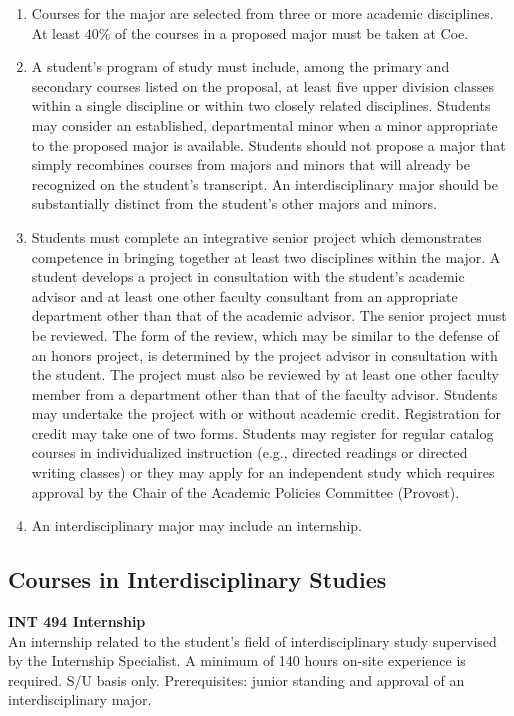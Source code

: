 \documentclass[
  letterpaper,
]{scrbook}
\providecommand{\tightlist}{%
  \setlength{\itemsep}{0pt}\setlength{\parskip}{0pt}}
\begin{document}
\begin{enumerate}
\def\labelenumi{\arabic{enumi}.}
\tightlist
\item
  Courses for the major are selected from three or more academic
  disciplines. At least 40\% of the courses in a proposed major must be
  taken at Coe.
\item
  A student's program of study must include, among the primary and
  secondary courses listed on the proposal, at least five upper division
  classes within a single discipline or within two closely related
  disciplines. Students may consider an established, departmental minor
  when a minor appropriate to the proposed major is available. Students
  should not propose a major that simply recombines courses from majors
  and minors that will already be recognized on the student's
  transcript. An interdisciplinary major should be substantially
  distinct from the student's other majors and minors.
\item
  Students must complete an integrative senior project which
  demonstrates competence in bringing together at least two disciplines
  within the major. A student develops a project in consultation with
  the student's academic advisor and at least one other faculty
  consultant from an appropriate department other than that of the
  academic advisor. The senior project must be reviewed. The form of the
  review, which may be similar to the defense of an honors project, is
  determined by the project advisor in consultation with the student.
  The project must also be reviewed by at least one other faculty member
  from a department other than that of the faculty advisor. Students may
  undertake the project with or without academic credit. Registration
  for credit may take one of two forms. Students may register for
  regular catalog courses in individualized instruction (e.g., directed
  readings or directed writing classes) or they may apply for an
  independent study which requires approval by the Chair of the Academic
  Policies Committee (Provost).
\item
  An interdisciplinary major may include an internship.
\end{enumerate}

\subsection{Courses in Interdisciplinary
Studies}\label{courses-in-interdisciplinary-studies}

\textbf{INT 494 Internship}\\
An internship related to the student's field of interdisciplinary study
supervised by the Internship Specialist. A minimum of 140 hours on-site
experience is required. S/U basis only. Prerequisites: junior standing
and approval of an interdisciplinary major.
\end{document}
